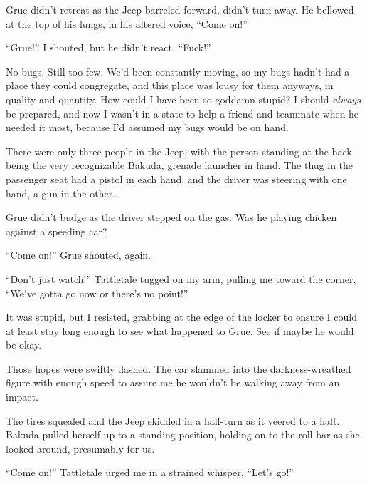 Grue didn't retreat as the Jeep barreled forward, didn't turn away.  He bellowed at the top of his lungs, in his altered voice, ``Come on!''



``Grue!'' I shouted, but he didn't react.  ``Fuck!''



No bugs.  Still too few.  We'd been constantly moving, so my bugs hadn't had a place they could congregate, and this place was lousy for them anyways, in quality and quantity.  How could I have been so goddamn stupid?  I should \emph{always} be prepared, and now I wasn't in a state to help a friend and teammate when he needed it most, because I'd assumed my bugs would be on hand.



There were only three people in the Jeep, with the person standing at the back being the very recognizable Bakuda, grenade launcher in hand.  The thug in the passenger seat had a pistol in each hand, and the driver was steering with one hand, a gun in the other.



Grue didn't budge as the driver stepped on the gas.  Was he playing chicken against a speeding car?



``Come on!'' Grue shouted, again.



``Don't just watch!'' Tattletale tugged on my arm, pulling me toward the corner, ``We've gotta go now or there's no point!''



It was stupid, but I resisted, grabbing at the edge of the locker to ensure I could at least stay long enough to see what happened to Grue.  See if maybe he would be okay.



Those hopes were swiftly dashed.  The car slammed into the darkness-wreathed figure with enough speed to assure me he wouldn't be walking away from an impact.



The tires squealed and the Jeep skidded in a half-turn as it veered to a halt.  Bakuda pulled herself up to a standing position, holding on to the roll bar as she looked around, presumably for us.



``Come on!'' Tattletale urged me in a strained whisper, ``Let's go!''



